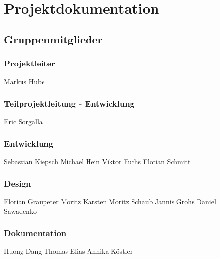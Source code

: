 \documentclass[12pt,a4paper]{article}
\begin{document}
\section*{Projektdokumentation}
\subsection*{Gruppenmitglieder}
\subsubsection*{Projektleiter}
Markus Hube
\subsubsection*{Teilprojektleitung - Entwicklung}
Eric Sorgalla
\subsubsection*{Entwicklung}
Sebastian Kiepsch
\newline
Michael Hein
\newline
Viktor Fuchs
\newline
Florian Schmitt 
\subsubsection*{Design}
Florian Graupeter
\newline
Moritz Karsten
\newline
Moritz Schaub
\newline
Jannis Grohs
\newline
Daniel Sawadenko 
\subsubsection*{Dokumentation}
Huong Dang
\newline
Thomas Elias
\newline
Annika Köstler
\newpage

\end{document}
